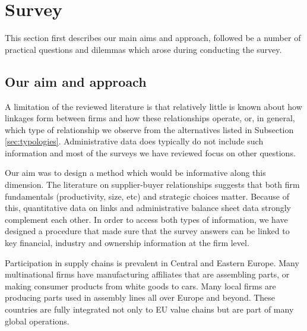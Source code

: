 \usepackage{}\documentclass[final, dvipsnames, authoryear,12pt]{elsarticle}
\begin{document}



\section{ Survey}
\label{sec:survey}

This section first describes our main aims and approach, followed be a number of practical questions and dilemmas which arose during conducting the survey.

  
\subsection{Our aim and approach}

A limitation of the reviewed literature is that relatively little is known about how linkages form between firms and how these relationships operate, or, in general, which type of relationship we observe from the alternatives listed in Subsection \ref{sec:typologies}. Administrative data does typically do not include such information and most of the surveys we have reviewed focus on other questions.

Our aim was to design a method which would be informative along this dimension. The literature on supplier-buyer relationships suggests that both firm fundamentals (productivity, size, etc) and strategic choices matter. Because of this, quantitative data on links and administrative balance sheet data strongly complement each other. In order to access both types of information, we have designed a procedure that made sure that the survey answers can be linked to key financial, industry and ownership information at the firm level.

Participation in supply chains is prevalent in Central and Eastern Europe. Many multinational firms have manufacturing affiliates that are assembling parts, or making consumer products from white goods to cars. Many local firms are producing parts used in assembly lines all over Europe and beyond. These countries are fully integrated not only to EU value chains but are part of many global operations. 
\end{document}
